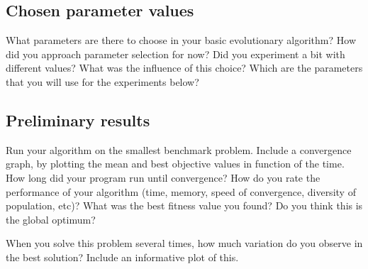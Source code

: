 \documentclass[a4paper,10pt]{article}
\newcommand{\ReplaceMe}[1]{{\color{blue}#1}}
\begin{document}
\subsection{Chosen parameter values}

\ReplaceMe{What parameters are there to choose in your basic evolutionary algorithm? How did you approach parameter selection for now? Did you experiment a bit with different values? What was the influence of this choice? Which are the parameters that you will use for the experiments below?}

\subsection{Preliminary results}

\ReplaceMe{Run your algorithm on the smallest benchmark problem. Include a convergence graph, by plotting the mean and best objective values in function of the time. How long did your program run until convergence? How do you rate the performance of your algorithm (time, memory, speed of convergence, diversity of population, etc)? What was the best fitness value you found? Do you think this is the global optimum? 

When you solve this problem several times, how much variation do you observe in the best solution? Include an informative plot of this.}
\end{document}
